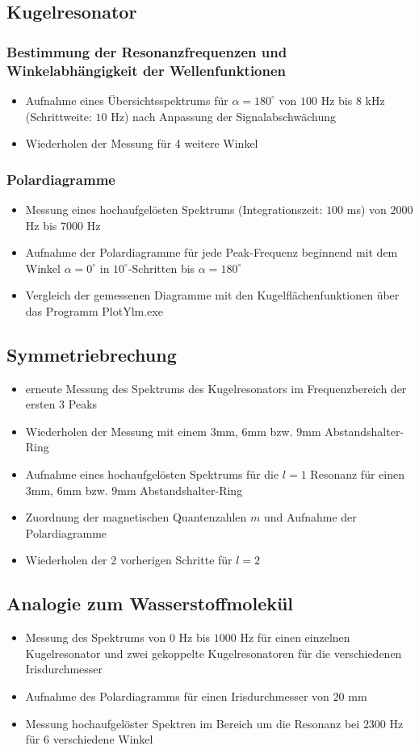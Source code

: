 \documentclass[german,  %
parskip=full,  %
]{scrartcl}
\begin{document}
\subsection{Kugelresonator}
\subsubsection{Bestimmung der Resonanzfrequenzen und Winkelabhängigkeit der Wellenfunktionen}
\begin{itemize}
\item Aufnahme eines Übersichtsspektrums für $\alpha = 180^{\circ}$ von $100$ Hz bis $8$ kHz (Schrittweite: $10$ Hz) nach Anpassung der Signalabschwächung
\item Wiederholen der Messung für 4 weitere Winkel
\end{itemize}
\subsubsection{Polardiagramme}
\begin{itemize}
\item Messung eines hochaufgelösten Spektrums (Integrationszeit: $100$ ms) von $2000$ Hz bis $7000$ Hz
\item Aufnahme der Polardiagramme für jede Peak-Frequenz beginnend mit dem Winkel $\alpha=0^{\circ}$ in $10^{\circ}$-Schritten bis $\alpha=180^{\circ}$
\item Vergleich der gemessenen Diagramme mit den Kugelflächenfunktionen über das Programm PlotYlm.exe
\end{itemize}
\subsection{Symmetriebrechung}
\begin{itemize}
\item erneute Messung des Spektrums des Kugelresonators im Frequenzbereich der ersten 3 Peaks
\item Wiederholen der Messung mit einem $3$mm, $6$mm bzw. $9$mm Abstandshalter-Ring
\item Aufnahme eines hochaufgelösten Spektrums für die $l=1$ Resonanz für einen $3$mm, $6$mm bzw. $9$mm Abstandshalter-Ring
\item Zuordnung der magnetischen Quantenzahlen $m$ und Aufnahme der Polardiagramme 
\item Wiederholen der 2 vorherigen Schritte für $l=2$
\end{itemize}
\subsection{Analogie zum Wasserstoffmolekül}
\begin{itemize}
\item Messung des Spektrums von $0$ Hz bis $1000$ Hz für einen einzelnen Kugelresonator und zwei gekoppelte Kugelresonatoren für die verschiedenen Irisdurchmesser
\item Aufnahme des Polardiagramms für einen Irisdurchmesser von $20$ mm
\item Messung hochaufgelöster Spektren im Bereich um die Resonanz bei $2300$ Hz für 6 verschiedene Winkel 
\end{itemize}
\end{document}
